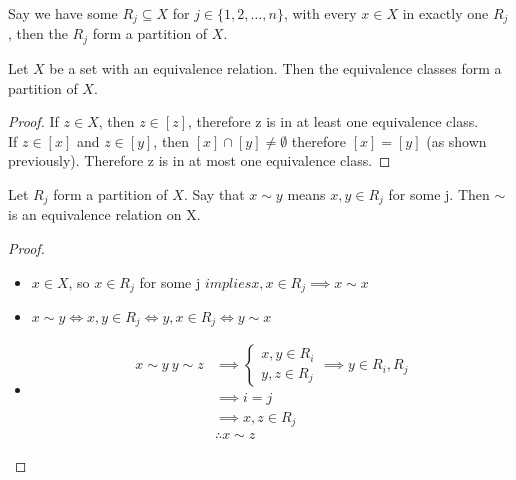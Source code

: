 \documentclass[openany]{report}
\begin{document}
\begin{definition}[Partitions]
Say we have some $R_j \subseteq X$ for $j \in \{1,2,\dots, n\}$, with every $x \in X$ in exactly one $R_j$, then the $R_j$ form a partition of $X$.
\end{definition}
\begin{theorem}
    Let $X$ be a set with an equivalence relation. Then the equivalence classes form a partition of $X$.
\end{theorem}
\begin{proof}
    If $z \in X$, then $z \in [z]$, therefore z is in at least one equivalence class.\\
    If $z \in [x]$ and $z \in [y]$, then $[x] \cap [y] \neq \emptyset$ therefore $[x] = [y]$ (as shown previously). Therefore z is in at most one equivalence class.
\end{proof}
\begin{theorem}
    Let $R_j$ form a partition of $X$. Say that $x \sim y$ means $x,y \in R_j$ for some j. Then $\sim$ is an equivalence relation on X.
\end{theorem}
\begin{proof}
\[\]
    \begin{itemize}
        \item $x \in X$, so $x \in R_j$ for some j $implies x,x \in R_j \implies x \sim x$
        \item $x \sim y \iff x,y \in R_j \iff y,x \in R_j \iff y \sim x$
        \item \begin{align*}
            x \sim y \ y \sim z &\implies 
                \begin{cases}
                    x,y \in R_i\\
                    y,z \in R_j
                \end{cases}
                \implies y \in R_i, R_j \\ 
                &\implies i=j\\
                &\implies x,z \in R_j\\
                &\therefore x \sim z
        \end{align*}
    \end{itemize}
\end{proof}
\end{document}
